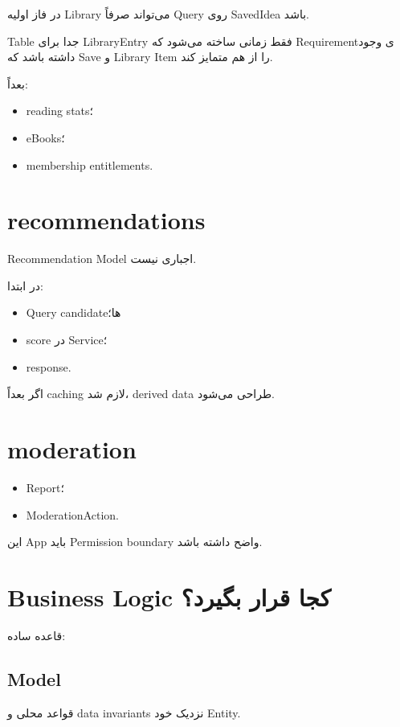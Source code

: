 در فاز اولیه Library می‌تواند صرفاً Query روی SavedIdea باشد.

\begin{decisionbox}
Table جدا برای LibraryEntry فقط زمانی ساخته می‌شود که Requirementی وجود داشته باشد که Save و Library Item را از هم متمایز کند.
\end{decisionbox}

بعداً:
\begin{itemize}
  \item reading stats؛
  \item eBooks؛
  \item membership entitlements.
\end{itemize}

\section{recommendations}

Recommendation Model اجباری نیست.

در ابتدا:
\begin{itemize}
  \item Query candidateها؛
  \item score در Service؛
  \item response.
\end{itemize}

اگر بعداً caching لازم شد، derived data طراحی می‌شود.

\section{moderation}

\begin{itemize}
  \item Report؛
  \item ModerationAction.
\end{itemize}

این App باید Permission boundary واضح داشته باشد.

\section{Business Logic کجا قرار بگیرد؟}

قاعده ساده:

\subsection{Model}

قواعد محلی و data invariants نزدیک خود Entity.

